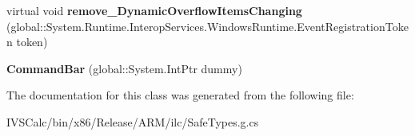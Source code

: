 \begin{DoxyCompactItemize}
virtual void {\bfseries remove\+\_\+\+Dynamic\+Overflow\+Items\+Changing} (global\+::\+System.\+Runtime.\+Interop\+Services.\+Windows\+Runtime.\+Event\+Registration\+Token token)
\item 
\mbox{\label{class_windows_1_1_u_i_1_1_xaml_1_1_controls_1_1_command_bar_a9a0fc839b78496edf0afaebb86ed91bb}} 
{\bfseries Command\+Bar} (global\+::\+System.\+Int\+Ptr dummy)
\end{DoxyCompactItemize}


The documentation for this class was generated from the following file\+:\begin{DoxyCompactItemize}
\item 
I\+V\+S\+Calc/bin/x86/\+Release/\+A\+R\+M/ilc/Safe\+Types.\+g.\+cs\end{DoxyCompactItemize}
